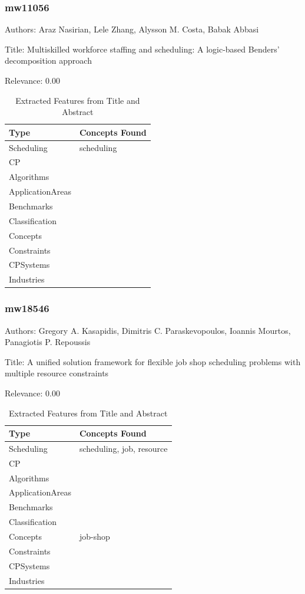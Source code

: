 \subsubsection{mw11056}
\label{mw:mw11056}

Authors: Araz Nasirian, Lele Zhang, Alysson M. Costa, Babak Abbasi

Title: Multiskilled workforce staffing and scheduling: A logic-based Benders’ decomposition approach

Relevance:  0.00

{\scriptsize
\begin{longtable}{p{2cm}p{20cm}}
\caption{Extracted Features from Title and Abstract}\\ \toprule
Type & Concepts Found\\ \midrule
\endhead
\bottomrule
\endfoot
Scheduling & scheduling\\ 
CP & \\ 
Algorithms & \\ 
ApplicationAreas & \\ 
Benchmarks & \\ 
Classification & \\ 
Concepts & \\ 
Constraints & \\ 
CPSystems & \\ 
Industries & \\ 
\end{longtable}
}



\subsubsection{mw18546}
\label{mw:mw18546}

Authors: Gregory A. Kasapidis, Dimitris C. Paraskevopoulos, Ioannis Mourtos, Panagiotis P. Repoussis

Title: A unified solution framework for flexible job shop scheduling problems with multiple resource constraints

Relevance:  0.00

{\scriptsize
\begin{longtable}{p{2cm}p{20cm}}
\caption{Extracted Features from Title and Abstract}\\ \toprule
Type & Concepts Found\\ \midrule
\endhead
\bottomrule
\endfoot
Scheduling & scheduling, job, resource\\ 
CP & \\ 
Algorithms & \\ 
ApplicationAreas & \\ 
Benchmarks & \\ 
Classification & \\ 
Concepts & job-shop\\ 
Constraints & \\ 
CPSystems & \\ 
Industries & \\ 
\end{longtable}
}




